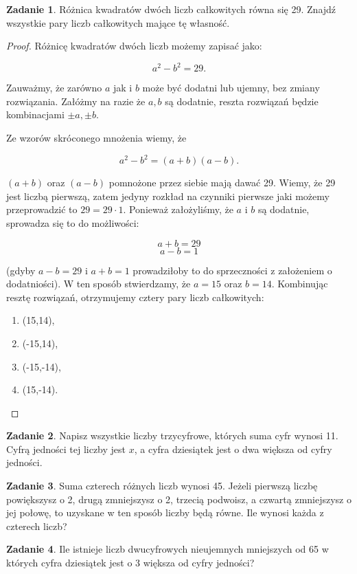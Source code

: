 \documentclass[11pt]{article}
\theoremstyle{definition}
\newtheorem{zad}{Zadanie}
\numberwithin{zad}{section}
\begin{document}
\begin{zad}
Różnica kwadratów dwóch liczb całkowitych równa się 29. Znajdź wszystkie pary liczb całkowitych mające tę własność.
\end{zad}
\begin{proof}
Różnicę kwadratów dwóch liczb możemy zapisać jako:

$$a^2 - b^2 = 29.$$

Zauważmy, że zarówno $a$ jak i $b$ może być dodatni lub ujemny, bez zmiany rozwiązania. Załóżmy na razie że $a, b$ są dodatnie, reszta rozwiązań będzie kombinacjami $\pm a, \pm b$.

Ze wzorów skróconego mnożenia wiemy, że 

$$a^2-b^2 = (a+b)(a-b).$$

$(a+b)$ oraz $(a-b)$ pomnożone przez siebie mają dawać 29. Wiemy, że 29 jest liczbą pierwszą, zatem jedyny rozkład na czynniki pierwsze jaki możemy przeprowadzić to $29 = 29\cdot 1$. Ponieważ założyliśmy, że $a$ i $b$ są dodatnie, sprowadza się to do możliwości:

$$a+b = 29$$
$$a-b = 1$$

(gdyby $a-b=29$ i $a+b=1$ prowadziłoby to do sprzeczności z założeniem o dodatniości). W ten sposób stwierdzamy, że $a = 15$ oraz $b= 14$. Kombinując resztę rozwiązań, otrzymujemy cztery pary liczb całkowitych:
\begin{enumerate}
\item (15,14),
\item (-15,14),
\item (-15,-14),
\item (15,-14).
\end{enumerate}
\end{proof}

\begin{zad}
Napisz wszystkie liczby trzycyfrowe, których suma cyfr wynosi 11. Cyfrą jedności tej liczby jest $x$, a cyfra dziesiątek jest o dwa większa od cyfry jedności.
\end{zad}

\begin{zad}
Suma czterech różnych liczb wynosi 45. Jeżeli pierwszą liczbę powiększysz o 2, drugą zmniejszysz o 2, trzecią podwoisz, a czwartą zmniejszysz o jej połowę, to uzyskane w ten sposób liczby będą równe. Ile wynosi każda z czterech liczb?
\end{zad}

\begin{zad}
Ile istnieje liczb dwucyfrowych nieujemnych mniejszych od 65 w których cyfra dziesiątek jest o 3 większa od cyfry jedności?
\end{zad}
\end{document}
